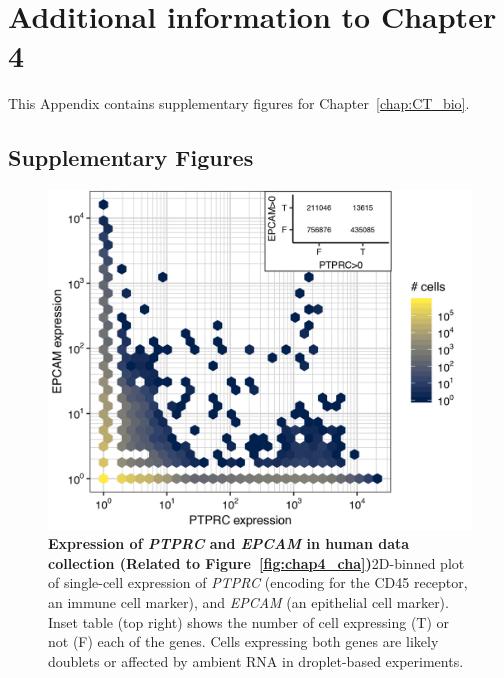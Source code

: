 
\chapter{Additional information to Chapter 4} \label{appendix:CTsub}
This Appendix contains supplementary figures for Chapter~\ref{chap:CT_bio}.


\section{Supplementary Figures}
\label{sectionB1.1}

\begin{figure}[ht!] 
\centering    
\includegraphics[width=1.0\textwidth]{Appendix2/Figs/PTPRC_EPCAM_human.png} %
\caption[Expression of \textit{PTPRC} and \textit{EPCAM} in human data collection]{\textbf{Expression of \textit{PTPRC} and \textit{EPCAM} in human data collection (Related to Figure~\ref{fig:chap4_cha})}\newline2D-binned plot of single-cell expression of \textit{PTPRC} (encoding for the CD45 receptor, an immune cell marker), and \textit{EPCAM} (an epithelial cell marker). Inset table (top right) shows the number of cell expressing (T) or not (F) each of the genes. Cells expressing both genes are likely doublets or affected by ambient RNA in droplet-based experiments.}
\label{fig:appB_ptprc}
\end{figure}
